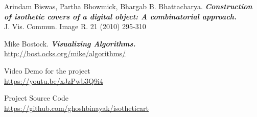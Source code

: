\documentclass[12pt]{article}
\begin{document}
\newpage




\begin{thebibliography}{9}
	{
		Arindam Biswas, Partha Bhowmick, Bhargab B. Bhattacharya. 
		{\bf \em Construction of isothetic covers of a digital object: A combinatorial approach.}\\
		 J. Vis. Commun. Image R. 21 (2010) 295-310
	}
	
	{
		Mike Bostock. {\bf \em Visualizing Algorithms.}\\
		\url{http://bost.ocks.org/mike/algorithms/}
	}
	
	{
		Video Demo for the project\\
		\url{https://youtu.be/xJzPwb3Q9i4}
	}
	
	{
		Project Source Code\\
		\url{https://github.com/ghoshbinayak/isotheticart}
	}
\end{thebibliography}




\newpage
\end{document}
